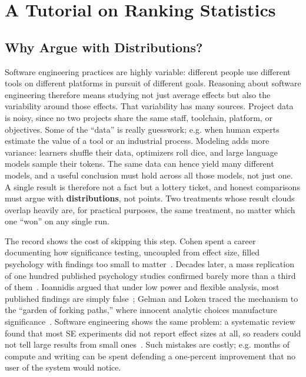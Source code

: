 \section{A Tutorial on Ranking Statistics}
\label{sec:stats}

\subsection{Why Argue with Distributions?}

Software engineering practices are highly variable: different
people use different tools on different platforms in pursuit of
different goals.
Reasoning about software engineering therefore means studying
not just average effects but also the variability around those
effects.
That variability has many sources.
Project data is noisy, since no two projects share the same
staff, toolchain, platform, or objectives.
Some of the ``data'' is really guesswork; e.g. when human
experts estimate the value of a tool or an industrial process.
Modeling adds more variance: learners shuffle their data,
optimizers roll dice, and large language models sample their
tokens.
The same data can hence yield many different models, and a
useful conclusion must hold across all those models, not just
one.
A single result is therefore not a fact but a lottery ticket,
and honest comparisons must argue with \textbf{distributions},
not points.
Two treatments whose result clouds overlap heavily are, for
practical purposes, the same treatment, no matter which one
``won'' on any single run.

The record shows the cost of skipping this step.
Cohen spent a career documenting how significance testing,
uncoupled from effect size, filled psychology with findings too
small to matter~\cite{cohen88,cohen94}.
Decades later, a mass replication of one hundred published
psychology studies confirmed barely more than a third of
them~\cite{osc15}.
Ioannidis argued that under low power and flexible analysis,
most published findings are simply false~\cite{ioannidis05};
Gelman and Loken traced the mechanism to the ``garden of
forking paths,'' where innocent analytic choices manufacture
significance~\cite{gelman14}.
Software engineering shows the same problem: a systematic
review found that most SE experiments did not report effect
sizes at all, so readers could not tell large results from
small ones~\cite{kampenes07}.
Such mistakes are costly; e.g. months of compute and writing
can be spent defending a one-percent improvement that no user
of the system would notice.

